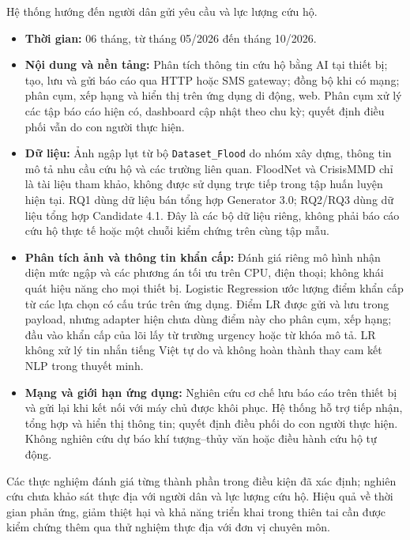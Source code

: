 Hệ thống hướng đến người dân gửi yêu cầu và lực lượng cứu hộ.


\begin{itemize}
    \item \textbf{Thời gian:} 06 tháng, từ tháng 05/2026 đến tháng 10/2026.
    \item \textbf{Nội dung và nền tảng:} Phân tích thông tin cứu hộ bằng AI tại thiết bị; tạo, lưu và gửi báo cáo qua HTTP hoặc SMS gateway; đồng bộ khi có mạng; phân cụm, xếp hạng và hiển thị trên ứng dụng di động, web. Phân cụm xử lý các tập báo cáo hiện có, dashboard cập nhật theo chu kỳ; quyết định điều phối vẫn do con người thực hiện.
    \item \textbf{Dữ liệu:} Ảnh ngập lụt từ bộ \texttt{Dataset\_Flood} do nhóm xây dựng, thông tin mô tả nhu cầu cứu hộ và các trường liên quan. FloodNet và CrisisMMD chỉ là tài liệu tham khảo, không được sử dụng trực tiếp trong tập huấn luyện hiện tại. RQ1 dùng dữ liệu bán tổng hợp Generator 3.0; RQ2/RQ3 dùng dữ liệu tổng hợp Candidate 4.1. Đây là các bộ dữ liệu riêng, không phải báo cáo cứu hộ thực tế hoặc một chuỗi kiểm chứng trên cùng tập mẫu.
    \item \textbf{Phân tích ảnh và thông tin khẩn cấp:} Đánh giá riêng mô hình nhận diện mức ngập và các phương án tối ưu trên CPU, điện thoại; không khái quát hiệu năng cho mọi thiết bị. Logistic Regression ước lượng điểm khẩn cấp từ các lựa chọn có cấu trúc trên ứng dụng. Điểm LR được gửi và lưu trong payload, nhưng adapter hiện chưa dùng điểm này cho phân cụm, xếp hạng; đầu vào khẩn cấp của lõi lấy từ trường urgency hoặc từ khóa mô tả. LR không xử lý tin nhắn tiếng Việt tự do và không hoàn thành thay cam kết NLP trong thuyết minh.
    \item \textbf{Mạng và giới hạn ứng dụng:} Nghiên cứu cơ chế lưu báo cáo trên thiết bị và gửi lại khi kết nối với máy chủ được khôi phục. Hệ thống hỗ trợ tiếp nhận, tổng hợp và hiển thị thông tin; quyết định điều phối do con người thực hiện. Không nghiên cứu dự báo khí tượng--thủy văn hoặc điều hành cứu hộ tự động.
\end{itemize}

Các thực nghiệm đánh giá từng thành phần trong điều kiện đã xác định; nghiên cứu chưa khảo sát thực địa với người dân và lực lượng cứu hộ. Hiệu quả về thời gian phản ứng, giảm thiệt hại và khả năng triển khai trong thiên tai cần được kiểm chứng thêm qua thử nghiệm thực địa với đơn vị chuyên môn.
